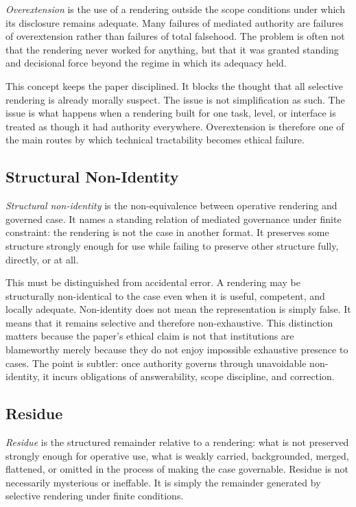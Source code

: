 \documentclass[11pt]{article}
\renewcommand{\emph}[1]{\textit{#1}}
\begin{document}
\emph{Overextension} is the use of a rendering outside the scope conditions under which its disclosure remains adequate. Many failures of mediated authority are failures of overextension rather than failures of total falsehood. The problem is often not that the rendering never worked for anything, but that it was granted standing and decisional force beyond the regime in which its adequacy held. \cite{Swanson2026ConstrainedDescribability,LepriEtAl2018FairTransparentAccountableADM,Tabassi2023NISTAIRMF}

This concept keeps the paper disciplined. It blocks the thought that all selective rendering is already morally suspect. The issue is not simplification as such. The issue is what happens when a rendering built for one task, level, or interface is treated as though it had authority everywhere. Overextension is therefore one of the main routes by which technical tractability becomes ethical failure.

\subsection{Structural Non-Identity}

\emph{Structural non-identity} is the non-equivalence between operative rendering and governed case. It names a standing relation of mediated governance under finite constraint: the rendering is not the case in another format. It preserves some structure strongly enough for use while failing to preserve other structure fully, directly, or at all. \cite{Swanson2026ConstraintConditionDisclosure,FriggNguyen2021ScientificRepresentationSEP}

This must be distinguished from accidental error. A rendering may be structurally non-identical to the case even when it is useful, competent, and locally adequate. Non-identity does not mean the representation is simply false. It means that it remains selective and therefore non-exhaustive. This distinction matters because the paper's ethical claim is not that institutions are blameworthy merely because they do not enjoy impossible exhaustive presence to cases. The point is subtler: once authority governs through unavoidable non-identity, it incurs obligations of answerability, scope discipline, and correction.

\subsection{Residue}

\emph{Residue} is the structured remainder relative to a rendering: what is not preserved strongly enough for operative use, what is weakly carried, backgrounded, merged, flattened, or omitted in the process of making the case governable. Residue is not necessarily mysterious or ineffable. It is simply the remainder generated by selective rendering under finite conditions. \cite{Swanson2026ConstraintConditionDisclosure,Swanson2026ConstrainedDescribability}
\end{document}
